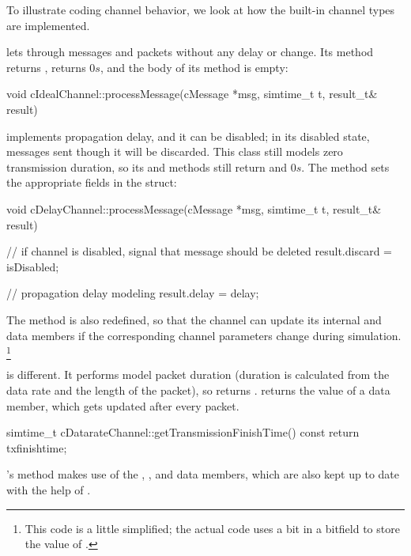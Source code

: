To illustrate coding channel behavior, we look at how the built-in channel
types are implemented.

 lets through messages and packets without
any delay or change. Its  method returns
,  returns $0s$, and the
body of its  method is empty:

\begin{cpp}
void cIdealChannel::processMessage(cMessage *msg, simtime_t t, result_t& result)
{
}
\end{cpp}

 implements propagation delay, and it can be
disabled; in its disabled state, messages sent though it will be discarded.
This class still models zero transmission duration, so its
 and 
methods still return  and $0s$. The  method
sets the appropriate fields in the  struct:

\begin{cpp}
void cDelayChannel::processMessage(cMessage *msg, simtime_t t, result_t& result)
{
    // if channel is disabled, signal that message should be deleted
    result.discard = isDisabled;

    // propagation delay modeling
    result.delay = delay;
}
\end{cpp}

The  method is also redefined, so that
the channel can update its internal  and 
data members if the corresponding channel parameters change during simulation.
\footnote{This code is a little simplified; the actual code uses a bit
in a bitfield to store the value of .}

 is different. It performs model packet duration
(duration is calculated from the data rate and the length of the packet),
so  returns .
 returns the value of a 
data member, which gets updated after every packet.

\begin{cpp}
simtime_t cDatarateChannel::getTransmissionFinishTime() const
{
    return txfinishtime;
}
\end{cpp}

's  method makes use of
the , ,  and  data
members, which are also kept up to date with the help of
.

